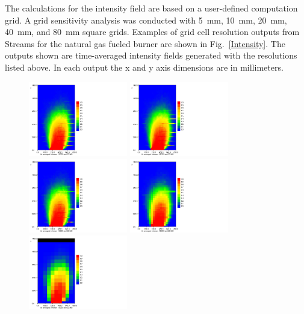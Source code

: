 \documentclass[twoside]{uocthesis}
\begin{document}
{The calculations for the intensity field are based on a user-defined computation grid.  A grid sensitivity analysis was conducted with 5~mm, 10~mm, 20~mm, 40~mm, and 80~mm square grids.  Examples of grid cell resolution outputs from Streams for the natural gas fueled burner are shown in Fig.~\ref{Intensity}.  The outputs shown are time-averaged intensity fields generated with the resolutions listed above. In each output the x and y axis dimensions are in millimeters.

\begin{figure}[p]
	\centering
	\includegraphics[trim=0in 0in 3.5in 0in,clip=true,width=1.7in]{../Figures/FHNG80_1_GS_5mm_10s_color}
	\includegraphics[trim=0in 0in 3.5in 0in,clip=true,width=1.7in]{../Figures/FHNG80_1_GS_10mm_10s_color}\\
	\includegraphics[trim=0in 0in 3.5in 0in,clip=true,width=1.7in]{../Figures/FHNG80_1_GS_20mm_10s_color}
	\includegraphics[trim=0in 0in 3.5in 0in,clip=true,width=1.7in]{../Figures/FHNG80_1_GS_40mm_10s_color}
	\includegraphics[trim=0in 0in 3.5in 0in,clip=true,width=1.7in]{../Figures/FHNG80_1_GS_80mm_10s_color}\\

\end{figure}}
\end{document}
